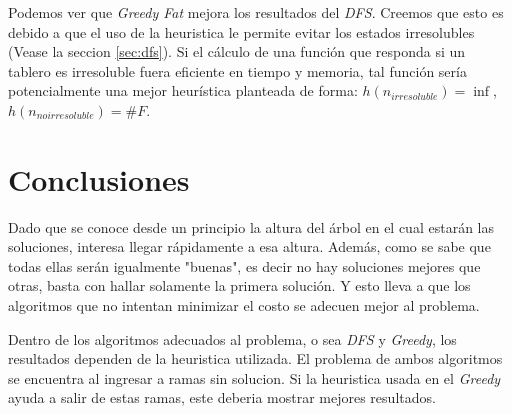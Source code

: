 \documentclass[a4paper,10pt]{article}
\begin{document}
    Podemos ver que \textit{Greedy Fat} mejora los resultados del \textit{DFS}.
    Creemos que esto es debido a que el uso de la heuristica le permite evitar los estados irresolubles (Vease la seccion \ref{sec:dfs}).
    Si el cálculo de una función que responda si un tablero es irresoluble fuera eficiente en tiempo y memoria, tal función sería potencialmente una mejor heurística planteada de forma: $h(n_{irresoluble}) = \inf$, $h(n_{no irresoluble}) = \#F$.

\section{Conclusiones}
    Dado que se conoce desde un principio la altura del árbol en el cual estarán las soluciones, interesa llegar rápidamente a esa altura.
    Además, como se sabe que todas ellas serán igualmente "buenas", es decir no hay soluciones mejores que otras, basta con hallar solamente la primera solución.
    Y esto lleva a que los algoritmos que no intentan minimizar el costo se adecuen mejor al problema.

    Dentro de los algoritmos adecuados al problema, o sea \textit{DFS} y \textit{Greedy}, los resultados dependen de la heuristica utilizada.
    El problema de ambos algoritmos se encuentra al ingresar a ramas sin solucion.
    Si la heuristica usada en el \textit{Greedy} ayuda a salir de estas ramas, este deberia mostrar mejores resultados.


\end{document}
